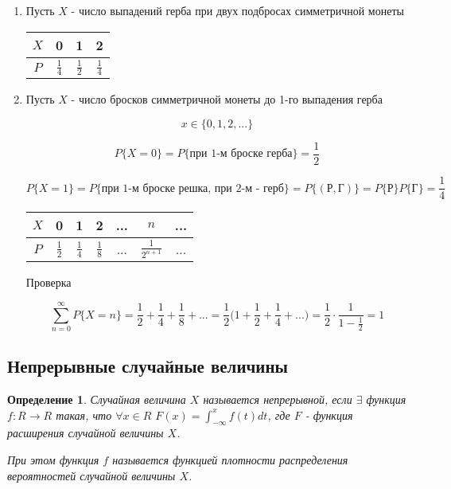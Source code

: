 \documentclass[a4paper, 14pt]{report}
\newtheorem{defenition}{Определение}[section]
\begin{document}
\begin{enumerate}
    \item Пусть $X$ - число выпадений герба при двух подбросах симметричной монеты

        \begin{tabular}{|c||c|c|c|}
                \hline
                $X$ & 0 & 1 & 2 \\
                \hline
                $P$ & $\frac{1}{4}$ & $\frac{1}{2}$ & $\frac{1}{4}$  \\
                \hline
        \end{tabular}

    \item Пусть $X$ - число бросков симметричной монеты до 1-го выпадения герба

        $$
        x \in \{0,1,2,...\}
        $$

        $$
        P\{X=0\} = P\{\text{при 1-м броске герба}\} = \frac{1}{2}
        $$

        $$
        P\{X=1\} = P\{\text{при 1-м броске решка, при 2-м - герб}\} = P\{(\text{Р},\text{Г})\} = P\{\text{Р}\} P\{\text{Г}\} = \frac{1}{4}
        $$

        \begin{tabular}{|c||c|c|c|c|c|c}
                \hline
                $X$ & 0 & 1 & 2 & ... & $n$ & ... \\
                \hline
                $P$ & $\frac{1}{2}$ & $\frac{1}{4}$ & $\frac{1}{8}$ & ... & $\frac{1}{2^{n+1}}$ & ...  \\
                \hline
        \end{tabular}

        Проверка

        $$
        \sum_{n=0}^\infty P\{X=n\} = \frac{1}{2} + \frac{1}{4} + \frac{1}{8} + ... = \frac{1}{2} \bigg(1 + \frac{1}{2} + \frac{1}{4} + ...\bigg) = \frac{1}{2} \cdot \frac{1}{1 - \frac{1}{2}} = 1
        $$

\end{enumerate}

\subsection{Непрерывные случайные величины}

\begin{defenition}
    Случайная величина $X$ называется непрерывной, если $\exists$ функция $f : R \to R$ такая,
    что $\forall x \in R$ $F(x) = \int_{-\infty}^x f(t) dt$, где $F$ - функция расширения случайной величины $X$.

    При этом функция $f$ называется функцией плотности распределения вероятностей случайной величины $X$.
\end{defenition}
\end{document}
